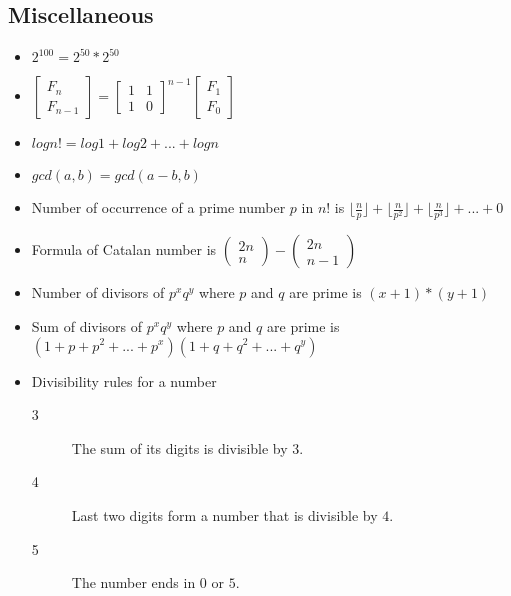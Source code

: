 \documentclass[10pt, a4paper]{article}
\begin{document}
\begin{multicols}{2}
\subsection{Miscellaneous}
\begin{itemize}
	\item \(2^{100} = 2^{50} * 2^{50}\)
	\item \( 
        \begin{bmatrix}
            F_n\\
            F_{n-1}
        \end{bmatrix} = 
        \begin{bmatrix}
            1 & 1\\
            1 & 0
        \end{bmatrix} ^ {n-1}
        \begin{bmatrix}
            F_1\\
            F_0
        \end{bmatrix}
    \)
    \item \(
        logn! = log1 +log2+...+logn
    \)
    \item \(
    	gcd(a, b) = gcd(a-b, b)
    \)
    \item Number of occurrence of a prime number $p$ in $n!$ is \(
    	\lfloor \frac{n}{p} \rfloor +	
    	\lfloor \frac{n}{p^2} \rfloor + 
    	\lfloor \frac{n}{p^3} \rfloor + ... + 0
    \)
    \item Formula of Catalan number is \(
    	\begin{pmatrix}
    		2n\\
    		n
    	\end{pmatrix}
    	 -
    	\begin{pmatrix}
    		2n\\
    		n - 1
    	\end{pmatrix}
    \)
    \item Number of divisors of $p^xq^y$ where $p$ and $q$ are prime is \(
    	(x + 1) * (y + 1)
    \)
    \item Sum of divisors of $p^xq^y$ where $p$ and $q$ are prime is \(
    	(1 + p + p^2 + ... + p^x) (1 + q + q^2 + ... + q^y)
    \)
    \item Divisibility rules for a number
    \begin{description}
	   	\item[3] The sum of its digits is divisible by $3$.
	   	\item[4] Last two digits form a number that is divisible by $4$.
	   	\item[5] The number ends in $0$ or $5$.

\end{description}
\end{itemize}
\end{multicols}
\end{document}
